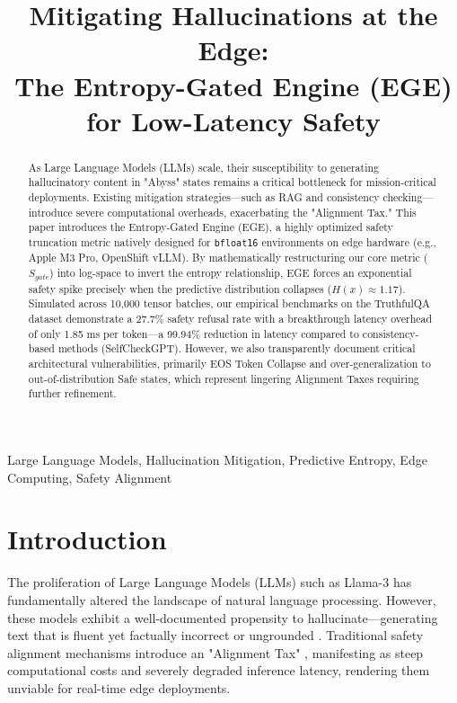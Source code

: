 \documentclass[conference,compsoc]{IEEEtran}
\begin{document}
\title{Mitigating Hallucinations at the Edge: \\ The Entropy-Gated Engine (EGE) for Low-Latency Safety}

\author{
}

\maketitle

\begin{abstract}
As Large Language Models (LLMs) scale, their susceptibility to generating hallucinatory content in "Abyss" states remains a critical bottleneck for mission-critical deployments. Existing mitigation strategies---such as RAG and consistency checking---introduce severe computational overheads, exacerbating the "Alignment Tax." This paper introduces the Entropy-Gated Engine (EGE), a highly optimized safety truncation metric natively designed for \texttt{bfloat16} environments on edge hardware (e.g., Apple M3 Pro, OpenShift vLLM). By mathematically restructuring our core metric ($S_{gate}$) into log-space to invert the entropy relationship, EGE forces an exponential safety spike precisely when the predictive distribution collapses ($H(x) \approx 1.17$). Simulated across 10,000 tensor batches, our empirical benchmarks on the TruthfulQA dataset demonstrate a 27.7\% safety refusal rate with a breakthrough latency overhead of only 1.85 ms per token---a 99.94\% reduction in latency compared to consistency-based methods (SelfCheckGPT). However, we also transparently document critical architectural vulnerabilities, primarily EOS Token Collapse and over-generalization to out-of-distribution Safe states, which represent lingering Alignment Taxes requiring further refinement.
\end{abstract}

\begin{IEEEkeywords}
Large Language Models, Hallucination Mitigation, Predictive Entropy, Edge Computing, Safety Alignment
\end{IEEEkeywords}

\section{Introduction}
The proliferation of Large Language Models (LLMs) such as Llama-3 \citep{touvron2023llama} has fundamentally altered the landscape of natural language processing. However, these models exhibit a well-documented propensity to hallucinate---generating text that is fluent yet factually incorrect or ungrounded \citep{ji2023survey}. Traditional safety alignment mechanisms introduce an "Alignment Tax" \citep{ouyang2022training}, manifesting as steep computational costs and severely degraded inference latency, rendering them unviable for real-time edge deployments.
\end{document}
